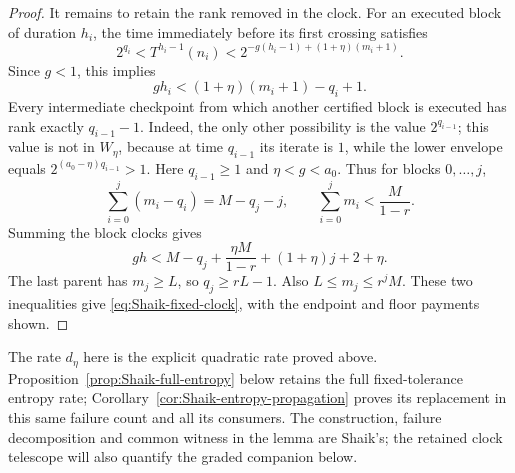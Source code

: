 \begin{proof}
It remains to retain the rank removed in the clock.
For an executed block of duration \(h_i\), the time immediately before
its first crossing satisfies
\[
 2^{q_i}<T^{h_i-1}(n_i)
 <2^{-g(h_i-1)+(1+\eta)(m_i+1)}.
\]
Since \(g<1\), this implies
\[
 gh_i<(1+\eta)(m_i+1)-q_i+1.
\]
Every intermediate checkpoint from which another certified block is
executed has rank exactly \(q_{i-1}-1\). Indeed, the only other possibility
is the value \(2^{q_{i-1}}\); this value is not in \(W_\eta\), because at
time \(q_{i-1}\) its iterate is \(1\), while the lower envelope equals
\(2^{(a_0-\eta)q_{i-1}}>1\).
Here \(q_{i-1}\ge1\) and \(\eta<g<a_0\).
Thus for blocks \(0,\ldots,j\),
\[
 \sum_{i=0}^j(m_i-q_i)=M-q_j-j,\qquad
 \sum_{i=0}^jm_i<\frac{M}{1-r}.
\]
Summing the block clocks gives
\[
 gh<M-q_j+\frac{\eta M}{1-r}+(1+\eta)j+2+\eta.
\]
The last parent has \(m_j\ge L\), so \(q_j\ge rL-1\).
Also \(L\le m_j\le r^jM\). These two inequalities give
\eqref{eq:Shaik-fixed-clock}, with the endpoint and floor payments shown.
\end{proof}

The rate \(d_\eta\) here is the explicit quadratic rate proved above.
Proposition~\ref{prop:Shaik-full-entropy} below retains the full
fixed-tolerance entropy rate; Corollary~\ref{cor:Shaik-entropy-propagation}
proves its replacement in this same failure count and all its consumers.
The construction, failure decomposition and common
witness in the lemma are Shaik's; the retained clock telescope will
also quantify the graded companion below.

